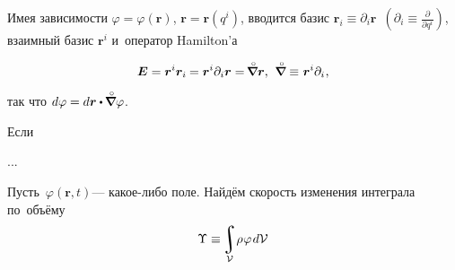 

\label{para:differentiation}

\begin{otherlanguage}{russian}

Имея зависимости ${\varphi \!=\! \varphi(\bm{r})}$, ${\bm{r} \!=\! \bm{r}(q^{i})}$, вводится базис ${\bm{r}_i \equiv \partial_i \bm{r}}$~${(\partial_i \equiv \frac{\partial}{\partial q^i})}$, взаимный базис ${\bm{r}^i}$ и~оператор Hamilton’а

\nopagebreak\vspace{-0.4em}\begin{equation}
\bm{E} = \bm{r}^i \bm{r}_i \hspace{-0.1ex} = \bm{r}^i \partial_i \bm{r} = \hspace{-0.25ex} \boldnablacircled \bm{r} , \:\,
\boldnablacircled \equiv \hspace{.1ex} \bm{r}^i \partial_i \hspace{.1ex} ,
\end{equation}

\vspace{-0.2em}\noindent так что ${d\varphi = d\bm{r} \dotp \hspace{-0.1ex} \boldnablacircled \varphi}$.

Если

...



Пусть~${\varphi(\bm{r},t)}$\:--- какое\hbox{-}либо поле. Найдём скорость изменения интеграла по~объёму
\[ \Upsilon \equiv \hspace{-0.2ex} \integral\displaylimits_{\mathcal{V}} \! \rho \hspace{0.1ex} \varphi \hspace{0.2ex} d\mathcal{V} \]


\end{otherlanguage}
